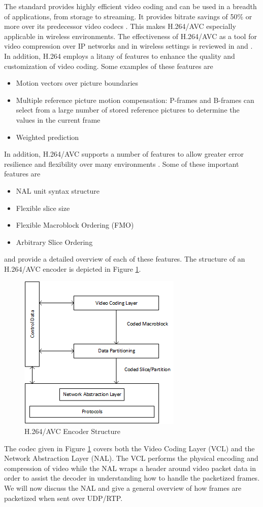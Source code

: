 \documentclass[3p,times,procedia]{elsarticle}
\begin{document}
The standard provides highly efficient video coding and can be used in a breadth of applications, from storage to streaming. It provides bitrate savings of 50\% or more over its predecessor video codecs \cite{RTP}. This makes H.264/AVC especially applicable in wireless environments. The effectiveness of H.264/AVC as a tool for video compression over IP networks and in wireless settings is reviewed  in \cite{H264OverIP} and \cite{WirelessH264}. In addition, H.264 employs a litany of features to enhance the quality and customization of video coding. Some examples of these features are 
\begin{itemize}
	\item Motion vectors over picture boundaries
	\item Multiple reference picture motion compensation: P-frames and B-frames can select from a large number of stored reference pictures to determine the values in the current frame \cite{H264AVCOverview}
	\item Weighted prediction
\end{itemize}
In addition, H.264/AVC supports a number of features to allow greater error resilience and flexibility over many environments \cite{H264AVCOverview}. Some of these important features are
\begin{itemize}
	\item NAL unit syntax structure
	\item Flexible slice size
	\item Flexible Macroblock Ordering (FMO)
	\item Arbitrary Slice Ordering
\end{itemize}
 \cite{H264AVCOverview} and \cite{H264Spec} provide a detailed overview of each of these features. The structure of an H.264/AVC encoder is depicted in Figure \ref{fig:H264EncoderStructure}.
\begin{figure}[H]
\centering
\includegraphics[width=0.4\linewidth]{H264AVCEncoderStructure.png}
\caption{H.264/AVC Encoder Structure \cite{H264AVCOverview}}
\label{fig:H264EncoderStructure}
\end{figure}
The codec given in Figure \ref{fig:H264EncoderStructure} covers both the Video Coding Layer (VCL) and the Network Abstraction Layer (NAL). The VCL performs the physical encoding and compression of video while the NAL wraps a header around video packet data in order to assist the decoder in understanding how to handle the packetized frames. We will now discuss the NAL and give a general overview of how frames are packetized when sent over UDP/RTP. 
\end{document}
